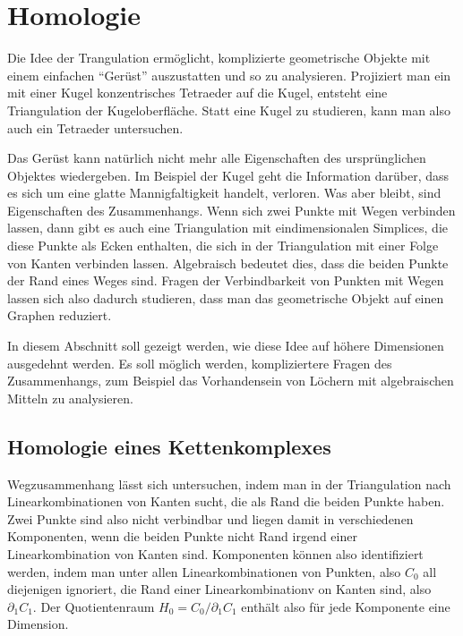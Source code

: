 %
%
%
\section{Homologie
\label{buch:section:homologie}}
Die Idee der Trangulation ermöglicht, komplizierte geometrische 
Objekte mit einem einfachen ``Gerüst'' auszustatten und so zu
analysieren. 
Projiziert man ein mit einer Kugel konzentrisches Tetraeder auf die
Kugel, entsteht eine Triangulation der Kugeloberfläche.
Statt eine Kugel zu studieren, kann man also auch ein Tetraeder untersuchen.

Das Gerüst kann natürlich nicht mehr alle Eigenschaften des ursprünglichen
Objektes wiedergeben.
Im Beispiel der Kugel geht die Information darüber, dass es sich um eine
glatte Mannigfaltigkeit handelt, verloren.
Was aber bleibt, sind Eigenschaften des Zusammenhangs.
Wenn sich zwei Punkte mit Wegen verbinden lassen, dann gibt es auch eine
Triangulation mit eindimensionalen Simplices, die diese Punkte als Ecken
enthalten, die sich in der Triangulation mit einer Folge von Kanten
verbinden lassen.
Algebraisch bedeutet dies, dass die beiden Punkte der Rand eines 
Weges sind.
Fragen der Verbindbarkeit von Punkten mit Wegen lassen sich also
dadurch studieren, dass man das geometrische Objekt auf einen Graphen
reduziert.

In diesem Abschnitt soll gezeigt werden, wie diese Idee auf höhere
Dimensionen ausgedehnt werden.
Es soll möglich werden, kompliziertere Fragen des Zusammenhangs, zum
Beispiel das Vorhandensein von Löchern mit algebraischen Mitteln
zu analysieren.

\subsection{Homologie eines Kettenkomplexes
\label{buch:subsection:homologie-eines-kettenkomplexes}}
Wegzusammenhang lässt sich untersuchen, indem man in der Triangulation
nach Linearkombinationen von Kanten sucht, die als Rand die beiden Punkte
haben.
Zwei Punkte sind also nicht verbindbar und liegen damit in verschiedenen
Komponenten, wenn die beiden Punkte nicht Rand irgend einer
Linearkombination von Kanten sind.
Komponenten können also identifiziert werden, indem man unter allen
Linearkombinationen von Punkten, also $C_0$ all diejenigen ignoriert,
die Rand einer Linearkombinationv on Kanten sind, also $\partial_1C_1$.
Der Quotientenraum $H_0=C_0/\partial_1C_1$ enthält also für jede Komponente
eine Dimension.

